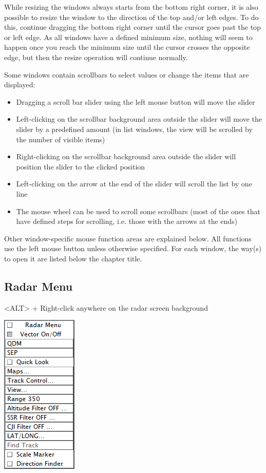 \documentclass[11pt,a4paper]{memoir}
\begin{document}
While resizing the windows always starts from the bottom right corner, it is also possible to resize the window to the direction of the top and/or left edges. To do this, continue dragging the bottom right corner until the cursor goes past the top or left edge. As all windows have a defined minimum size, nothing will seem to happen once you reach the minimum size until the cursor crosses the opposite edge, but then the resize operation will continue normally.

Some windows contain scrollbars to select values or change the items that are displayed:

\begin{itemize}
    \item Dragging a scroll bar slider using the left mouse button will move the slider
    \item Left-clicking on the scrollbar background area outside the slider will move the slider by a predefined amount (in list windows, the view will be scrolled by the number of visible items)
    \item Right-clicking on the scrollbar background area outside the slider will position the slider to the clicked position
    \item Left-clicking on the arrow at the end of the slider will scroll the list by one line
    \item The mouse wheel can be used to scroll some scrollbars (most of the ones that have defined steps for scrolling, i.e. those with the arrows at the ends)
\end{itemize}

Other window-specific mouse function areas are explained below. All functions use the left mouse button unless otherwise specified. For each window, the way(s) to open it are listed below the chapter title.

\subsection{Radar Menu}
\label{menu:radarm}
<ALT> + Right-click anywhere on the radar screen background

\includegraphics{img/radarmenu.png}
\end{document}
